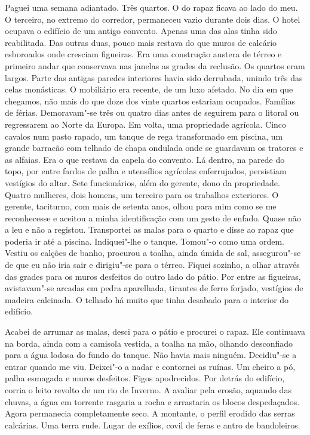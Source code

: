 Paguei uma semana adiantado. Três quartos. O do rapaz ficava ao lado do
meu. O terceiro, no extremo do corredor, permaneceu vazio durante dois
dias. O hotel ocupava o edifício de um antigo convento. Apenas uma das
alas tinha sido reabilitada. Das outras duas, pouco mais restava do que
muros de calcário esboroados onde cresciam figueiras. Era uma construção
austera de térreo e primeiro andar que conservava nas janelas as
grades da reclusão. Os quartos eram largos. Parte das antigas paredes
interiores havia sido derrubada, unindo três das celas monásticas. O
mobiliário era recente, de um luxo afetado. No dia em que chegamos, não
mais do que doze dos vinte quartos estariam ocupados. Famílias de
férias. Demoravam"-se três ou quatro dias antes de seguirem para o
litoral ou regressarem ao Norte da Europa. Em volta, uma propriedade
agrícola. Cinco cavalos num pasto rapado, um tanque de rega transformado
em piscina, um grande barracão com telhado de chapa ondulada onde se
guardavam os tratores e as alfaias. Era o que restava da capela do
convento. Lá dentro, na parede do topo, por entre fardos de palha e
utensílios agrícolas enferrujados, persistiam vestígios do altar. Sete
funcionários, além do gerente, dono da propriedade. Quatro mulheres,
dois homens, um terceiro para os trabalhos exteriores. O gerente,
taciturno, com mais de setenta anos, olhou para mim como se me
reconhecesse e aceitou a minha identificação com um gesto de enfado.
Quase não a leu e não a registou. Transportei as malas para o quarto e
disse ao rapaz que poderia ir até a piscina. Indiquei"-lhe o tanque.
Tomou"-o como uma ordem. Vestiu os calções de banho, procurou a toalha,
ainda úmida de sal, assegurou"-se de que eu não iria sair e dirigiu"-se
para o térreo. Fiquei sozinho, a olhar através das grades para os
muros desfeitos do outro lado do pátio. Por entre as figueiras,
avistavam"-se arcadas em pedra aparelhada, tirantes de ferro forjado,
vestígios de madeira calcinada. O telhado há muito que tinha desabado
para o interior do edifício.

Acabei de arrumar as malas, desci para o pátio e procurei o rapaz. Ele
continuava na borda, ainda com a camisola vestida, a toalha na mão,
olhando desconfiado para a água lodosa do fundo do tanque. Não havia
mais ninguém. Decidiu"-se a entrar quando me viu. Deixei"-o a nadar e
contornei as ruínas. Um cheiro a pó, palha esmagada e muros desfeitos.
Figos apodrecidos. Por detrás do edifício, corria o leito revolto de um
rio de Inverno. A avaliar pela erosão, aquando das chuvas, a água em
torrente rasgaria a rocha e arrastaria os blocos despedaçados. Agora
permanecia completamente seco. A montante, o perfil erodido das serras
calcárias. Uma terra rude. Lugar de exílios, covil de feras e antro de
bandoleiros.


